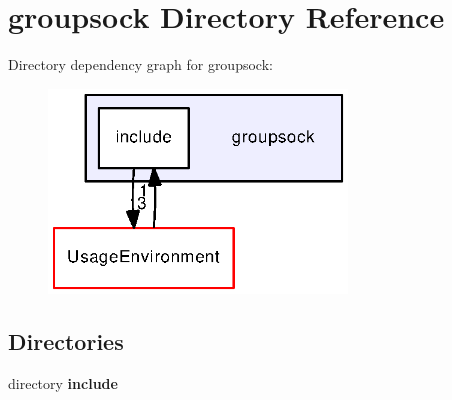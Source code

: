 \section{groupsock Directory Reference}
\label{dir_61fcfce872bbe7fdcda2e3de3347aa21}
Directory dependency graph for groupsock\+:
\nopagebreak
\begin{figure}[H]
\begin{center}
\leavevmode
\includegraphics[width=225pt]{dir_61fcfce872bbe7fdcda2e3de3347aa21_dep}
\end{center}
\end{figure}
\subsection*{Directories}
\begin{DoxyCompactItemize}
\item 
directory {\bf include}
\end{DoxyCompactItemize}
